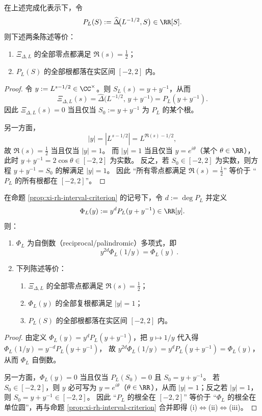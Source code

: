 \begin{proposition}\label{prop:xi-rh-interval-criterion}
在上述完成化表示下，令
\[
P_L(S):=\widehat\Delta\!\bigl(L^{-1/2},S\bigr)\in\RR[S].
\]
则下述两条陈述等价：
\begin{enumerate}
  \item \(\Xi_{\Delta,L}\) 的全部零点都满足 \(\Re(s)=\tfrac12\)；
  \item \(P_L(S)\) 的全部根都落在实区间 \([-2,2]\) 内。
\end{enumerate}
\end{proposition}
\begin{proof}
令 \(y:=L^{s-1/2}\in\CC^\times\)。则 \(S_L(s)=y+y^{-1}\)，从而
\[
\Xi_{\Delta,L}(s)=\widehat\Delta\!\bigl(L^{-1/2},\,y+y^{-1}\bigr)=P_L(y+y^{-1}).
\]
因此 \(\Xi_{\Delta,L}(s)=0\) 当且仅当 \(S_0:=y+y^{-1}\) 为 \(P_L\) 的某个根。
\par
另一方面，
\[
|y|=|L^{s-1/2}|=L^{\Re(s)-1/2},
\]
故 \(\Re(s)=\tfrac12\) 当且仅当 \(|y|=1\)。
而 \(|y|=1\) 当且仅当 \(y=e^{i\theta}\)（某个 \(\theta\in\RR\)），此时
\(
y+y^{-1}=2\cos\theta\in[-2,2]
\) 为实数。
反之，若 \(S_0\in[-2,2]\) 为实数，则方程 \(y+y^{-1}=S_0\) 的解满足 \(|y|=1\)。
因此 “所有零点都满足 \(\Re(s)=\tfrac12\)” 等价于 “\(P_L\) 的所有根都在 \([-2,2]\)”。
\end{proof}

\begin{corollary}\label{cor:xi-rh-unit-circle-reciprocal}
在命题 \ref{prop:xi-rh-interval-criterion} 的记号下，令 \(d:=\deg P_L\) 并定义
\[
\Phi_L(y):=y^{d}P_L(y+y^{-1})\in\RR[y].
\]
则：
\begin{enumerate}
  \item \(\Phi_L\) 为自倒数（reciprocal/palindromic）多项式，即
  \[
  \boxed{\ y^{2d}\Phi_L(1/y)=\Phi_L(y)\ }.
  \]
  \item 下列陈述等价：
  \begin{enumerate}
    \item[(i)] \(\Xi_{\Delta,L}\) 的全部零点都满足 \(\Re(s)=\tfrac12\)；
    \item[(ii)] \(\Phi_L(y)\) 的全部复根都满足 \(|y|=1\)；
    \item[(iii)] \(P_L(S)\) 的全部根都落在实区间 \([-2,2]\) 内。
  \end{enumerate}
\end{enumerate}
\end{corollary}
\begin{proof}
由定义 \(\Phi_L(y)=y^{d}P_L(y+y^{-1})\)，把 \(y\mapsto 1/y\) 代入得
\(
\Phi_L(1/y)=y^{-d}P_L(y+y^{-1})
\)，
故 \(y^{2d}\Phi_L(1/y)=y^{d}P_L(y+y^{-1})=\Phi_L(y)\)，从而 \(\Phi_L\) 自倒数。
\par
另一方面，\(\Phi_L(y)=0\) 当且仅当 \(P_L(S_0)=0\) 且 \(S_0=y+y^{-1}\)。
若 \(S_0\in[-2,2]\)，则 \(y\) 必可写为 \(y=e^{i\theta}\)（\(\theta\in\RR\)），从而 \(|y|=1\)；反之若 \(|y|=1\)，则 \(S_0=y+y^{-1}\in[-2,2]\)。
因此 “\(P_L\) 的根全在 \([-2,2]\)” 等价于 “\(\Phi_L\) 的根全在单位圆”，再与命题 \ref{prop:xi-rh-interval-criterion} 合并即得 (i)\(\Leftrightarrow\)(ii)\(\Leftrightarrow\)(iii)。
\end{proof}

